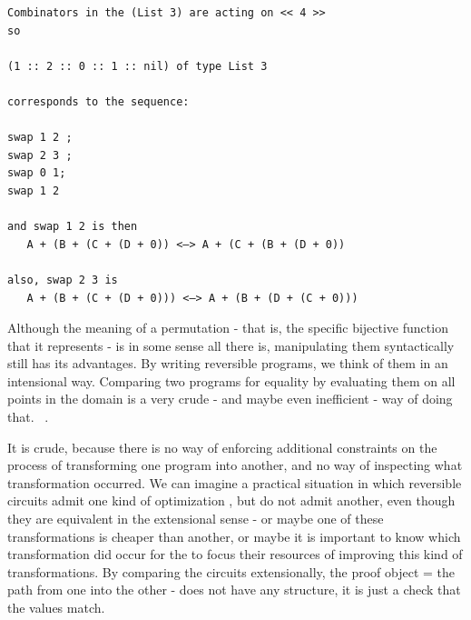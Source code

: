 








\begin{verbatim}
Combinators in the (List 3) are acting on << 4 >>
so

(1 :: 2 :: 0 :: 1 :: nil) of type List 3

corresponds to the sequence:

swap 1 2 ;
swap 2 3 ;
swap 0 1;
swap 1 2

and swap 1 2 is then
   A + (B + (C + (D + 0)) <—> A + (C + (B + (D + 0))

also, swap 2 3 is
   A + (B + (C + (D + 0))) <—> A + (B + (D + (C + 0)))
\end{verbatim}

Although the meaning of a permutation - that is, the specific bijective function
that it represents - is in some sense all there is, manipulating them
syntactically still has its advantages. By writing reversible programs, we think
of them in an intensional way. Comparing two programs for equality by evaluating
them on all points in the domain is a very crude - and maybe even inefficient -
way of doing that. ~\cite{Kuehlmann:2006:RBR:2298470.2300327,10.1007/978-3-540-24605-3_4,Yamashita:2010:FEQ:1835957.1835965}.

It is crude, because there is no way of enforcing additional constraints on the
process of transforming one program into another, and no way of inspecting what
transformation occurred. We can imagine a practical situation in which reversible
circuits admit one kind of optimization , but do not admit another,
even though they are equivalent in the extensional sense - or maybe one of these
transformations is cheaper than another, or maybe it is important to know which
transformation did occur for the  to focus their resources of
improving this kind of transformations. By comparing the circuits extensionally,
the proof object = the path from one into the other - does not have any
structure,  it is just a check that the values match.

